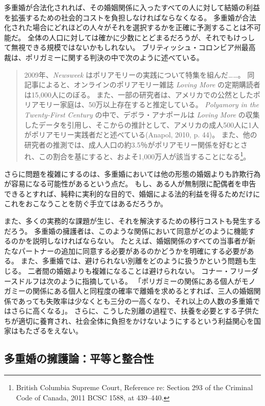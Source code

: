 \documentclass[paper=a4,book,openany]{jlreq} \usepackage{mystyle}
\begin{document}
多重婚が合法化されれば、その婚姻関係に入ったすべての人に対して結婚の利益を拡張するための社会的コストを負担しなければならなくなる。
多重婚が合法化された場合にどれほどの人々がそれを選択するかを正確に予測することは不可能だ。
全体の人口に対しては確かに少数にとどまるだろうが、それでもけっして無視できる規模ではないかもしれない。
ブリティッシュ・コロンビア州最高裁は、ポリガミーに関する判決の中で次のように述べている。

\begin{quote}
2009年、\emph{Newsweek} はポリアモリーの実践について特集を組んだ……。
同記事によると、オンラインのポリアモリー雑誌 \emph{Loving More} の定期購読者は15,000人にのぼる。
また、一部の研究者は、アメリカでの公然としたポリアモリー家庭は、50万以上存在すると推定している。
\emph{Polyamory in the Twenty-First Century} の中で、デボラ・アナポールは \emph{Loving More} の収集したデータを引用し、そこからの推計として、アメリカの成人500人に1人がポリアモリー実践者だと述べている(Anapol, 2010, p. 44)。
また、他の研究者の推測では、成人人口の約3.5％がポリアモリー関係を好むとされ、この割合を基にすると、およそ1,000万人が該当することになる\footnote{British Columbia Supreme Court, Reference re: Section 293 of the Criminal Code of Canada, 2011 BCSC 1588, at 439--440.}。
\nocite{anapol10:_polyam_centur}
\end{quote}

さらに問題を複雑にするのは、多重婚においては他の形態の婚姻よりも詐欺行為が容易になる可能性があるという点だ。
もし、ある人が無制限に配偶者を申告できるとすれば、純粋に実利的な目的で、婚姻による法的利益を得るためだけにこれをおこなうことを防ぐ手立てはあるだろうか。

また、多くの実務的な課題が生じ、それを解決するための移行コストも発生するだろう。
多重婚の擁護者は、このような関係において同意がどのように機能するのかを説明しなければならない。
たとえば、婚姻関係のすべての当事者が新たなパートナーの追加に同意する必要があるのかどうかを明確にする必要がある。
また、多重婚では、避けられない別離をどのように扱うかという問題も生じる。
二者間の婚姻よりも複雑になることは避けられない。
コナー・フリーダースドルフは次のように指摘している。
「ポリガミーの関係にある個人がモノガミーの関係にある個人と同程度の確率で離婚を求めるとすれば、三人の婚姻関係であっても失敗率は少なくとも三分の一高くなり、それ以上の人数の多重婚ではさらに高くなる」\citep{friedersdorf15:_case_encour_polyg}。
さらに、こうした別離の過程で、扶養を必要とする子供たちが適切に養育され、社会全体に負担をかけないようにするという利益関心を国家はもたざるをえない。

\subsection{多重婚の擁護論：平等と整合性}
\end{document}
